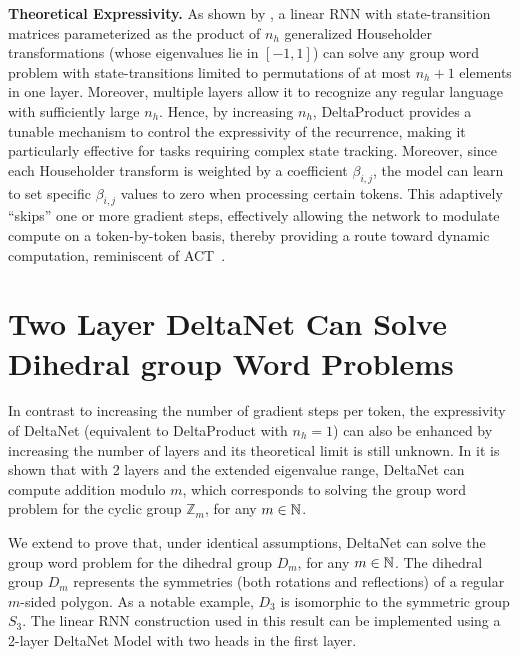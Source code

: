 \documentclass{article} %
\begin{document}
\textbf{Theoretical Expressivity.}
As shown by \citet[Theorem 3 and 4]{grazzi-iclr25a}, a linear RNN with state-transition matrices parameterized as the product of $n_h$ generalized Householder transformations (whose eigenvalues lie in $[-1,1]$) can solve any group word problem with state-transitions limited to permutations of at most $n_h + 1$ elements in one layer. Moreover, multiple layers allow it to recognize any regular language with sufficiently large $n_h$.
Hence, by increasing \(n_h\), DeltaProduct provides a tunable mechanism to control the expressivity of the recurrence, making it particularly effective for tasks requiring complex state tracking. Moreover, since each Householder transform is weighted by a coefficient \(\beta_{i,j}\), the model can learn to set specific \(\beta_{i,j}\) values to zero when processing certain tokens. This adaptively ``skips'' one or more gradient steps, effectively allowing the network to modulate compute on a token-by-token basis, thereby providing a route toward dynamic computation, reminiscent of ACT~\citep{graves2016adaptive}. 
\vspace{-5pt}
\section{Two Layer DeltaNet Can Solve Dihedral group Word Problems}
\label{sec:dihedral_theory}
\vspace{-7pt}
In contrast to increasing the number of gradient steps per token, the expressivity of DeltaNet (equivalent to DeltaProduct with $n_h = 1$) can also be enhanced by increasing the number of layers and its theoretical limit is still unknown. In \citet[Theorem 6]{grazzi-iclr25a} it is shown that  with 2 layers and the extended eigenvalue range, DeltaNet can compute addition modulo $m$, which corresponds to solving the group word problem for the cyclic group $\mathbb{Z}_m$, for any $m \in \mathbb{N}$.



We extend \citet[Theorem 6]{grazzi-iclr25a} to prove that, under identical assumptions, DeltaNet can solve the group word problem for the dihedral group $D_m$, for any $m \in \mathbb{N}$. The dihedral group $D_m$ represents the symmetries (both rotations and reflections) of a regular $m$-sided polygon. As a notable example, $D_3$ is isomorphic to the symmetric group $S_3$. The linear RNN construction used in this result can be implemented using a 2-layer DeltaNet Model with two heads in the first layer.
\end{document}
